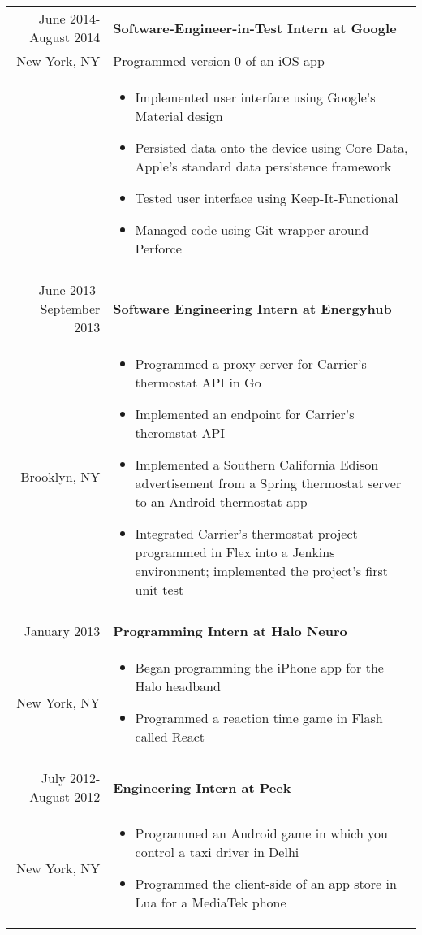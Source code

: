 \documentclass[letterpaper,10pt]{article} %
\begin{document}
\begin{longtable}{r|p{4.5in}}
    June 2014-August 2014 & \textbf{Software-Engineer-in-Test Intern at Google} \\
    New York, NY & Programmed version 0 of an iOS app \\
    & \begin{itemize}
        \item Implemented user interface using Google's Material design
        \item Persisted data onto the device using Core Data, Apple's standard data persistence framework
        \item Tested user interface using Keep-It-Functional
        \item Managed code using Git wrapper around Perforce
    \end{itemize} \\

    \multicolumn{2}{c}{} \\

    June 2013-September 2013 & \textbf{Software Engineering Intern at Energyhub} \\
    Brooklyn, NY & \begin{itemize}
        \item Programmed a proxy server for Carrier's thermostat API in Go
        \item Implemented an endpoint for Carrier's theromstat API
        \item
            Implemented a Southern California Edison advertisement from a Spring thermostat server
            to an Android thermostat app
        \item
            Integrated Carrier’s thermostat project programmed in Flex into a Jenkins environment;
            implemented the project’s first unit test
    \end{itemize} \\

    \multicolumn{2}{c}{} \\

    January 2013 & \textbf{Programming Intern at Halo Neuro} \\
    New York, NY & \begin{itemize}
        \item Began programming the iPhone app for the Halo headband
        \item Programmed a reaction time game in Flash called React
    \end{itemize} \\

    \multicolumn{2}{c}{} \\

    July 2012-August 2012 & \textbf{Engineering Intern at Peek} \\
    New York, NY & \begin{itemize}
        \item Programmed an Android game in which you control a taxi driver in Delhi
        \item Programmed the client-side of an app store in Lua for a MediaTek phone
    \end{itemize}
\end{longtable}
\end{document}
